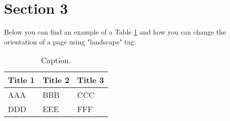 \section{Section 3}
Below you can find an example of a Table \ref{table:MLlandscape} and how you can change the orientation of a page using "landscape" tag:

\begin{landscape}

\begin{table}[!htb]
\centering
\caption{Caption.}
    \begin{tabular}{p{3cm}p{3cm}p{3cm}}
    \toprule
    \textbf{Title 1} & \textbf{Title 2}& \textbf{Title 3} \\
    \toprule
    AAA & BBB & CCC \\
    \midrule
    DDD & EEE & FFF \\
    \midrule
    \end{tabular}
\label{table:MLlandscape}
\end{table}

\end{landscape}
